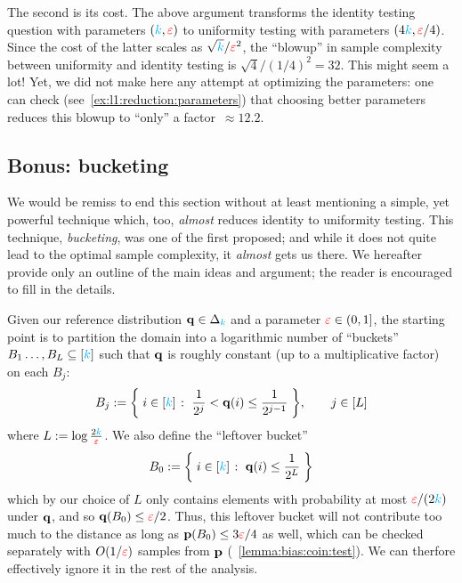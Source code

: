 The second is its cost. The above argument transforms the identity testing question with parameters $({\textcolor{cyan}{k}},\textcolor{red}{\varepsilon})$ to uniformity testing with parameters $(4{\textcolor{cyan}{k}}, \textcolor{red}{\varepsilon}/4)$. Since the cost of the latter scales as $\sqrt{{\textcolor{cyan}{k}}}/\textcolor{red}{\varepsilon}^2$, the ``blowup'' in sample complexity between uniformity and identity testing is $\sqrt{4}/(1/4)^2 = 32$. This might seem a lot! Yet, we did not make here any attempt at optimizing the parameters: one can check (see~\cref{ex:l1:reduction:parameters}) that choosing better parameters reduces this blowup to ``only'' a factor~$\approx 12.2$.

\subsection{Bonus: bucketing}
	\label{ssec:bucketing}
	We would be remiss to end this section without at least mentioning a simple, yet powerful technique which, too, \emph{almost} reduces identity to uniformity testing. This technique, \emph{bucketing}, was one of the first proposed; and while it does not quite lead to the optimal sample complexity, it \emph{almost} gets us there. We hereafter provide only an outline of the main ideas and argument; the reader is encouraged to fill in the details.

Given our reference distribution $\mathbf{q}\in\Delta_{{\textcolor{cyan}{k}}}$ and a parameter $\textcolor{red}{\varepsilon}\in(0,1]$, the starting point is to partition the domain into a logarithmic number of ``buckets'' $B_1\dots,B_L\subseteq[{\textcolor{cyan}{k}}]$ such that $\mathbf{q}$ is roughly constant (up to a multiplicative factor) on each $B_j$:
\begin{equation}
	\label{eq:bucketing}
		B_j \eqdef \setOfSuchThat{ i \in [\ab] }{ \frac{1}{2^{j}} < \q(i) \leq \frac{1}{2^{j-1}} }, \qquad j\in[L]
\end{equation}
where $L:= \log\frac{2{\textcolor{cyan}{k}}}{\textcolor{red}{\varepsilon}}$. We also define the ``leftover bucket'' 
\[
B_0 \eqdef \setOfSuchThat{ i \in [\ab] }{ \q(i) \leq \frac{1}{2^{L}} }
\]
 which by our choice of $L$ only contains elements with probability at most $\textcolor{red}{\varepsilon}/(2{\textcolor{cyan}{k}})$ under $\mathbf{q}$, and so $\mathbf{q}(B_0) \leq \textcolor{red}{\varepsilon}/2$. Thus, this leftover bucket will not contribute too much to the distance as long as $\mathbf{p}(B_0)\leq 3\textcolor{red}{\varepsilon}/4$ as well, which can be checked separately with $O(1/\textcolor{red}{\varepsilon})$ samples from $\mathbf{p}$ (\cf~\cref{lemma:bias:coin:test}). We can therfore effectively ignore it in the rest of the analysis.
 
